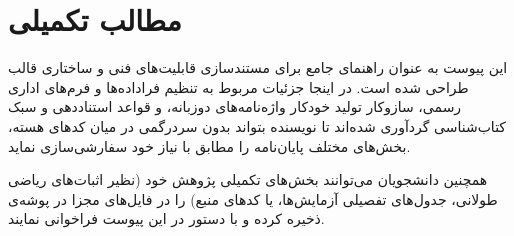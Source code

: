 %

\chapter{مطالب تکمیلی}\label{chap:appendix}

این پیوست به عنوان راهنمای جامع برای مستندسازی قابلیت‌های فنی و ساختاری قالب طراحی شده است. در اینجا جزئیات مربوط به تنظیم فراداده‌ها و فرم‌های اداری رسمی، سازوکار تولید خودکار واژه‌نامه‌های دوزبانه، و قواعد استناددهی و سبک کتاب‌شناسی گردآوری شده‌اند تا نویسنده بتواند بدون سردرگمی در میان کدهای هسته، بخش‌های مختلف پایان‌نامه را مطابق با نیاز خود سفارشی‌سازی نماید.

همچنین دانشجویان می‌توانند بخش‌های تکمیلی پژوهش خود (نظیر اثبات‌های ریاضی طولانی، جدول‌های تفصیلی آزمایش‌ها، یا کدهای منبع) را در فایل‌های مجزا در پوشه‌ی  ذخیره کرده و با دستور  در این پیوست فراخوانی نمایند.




